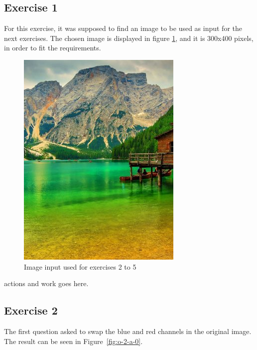 \documentclass[]{IEEEtran}
\begin{document}
  \subsection{Exercise 1}
  For this exercise, it was supposed to find an image to be used as input for the next exercises. The chosen image is displayed in figure \ref{fig:i-1-0}, and it is 300x400 pixels, in order to fit the requirements.
  \begin{figure}[!h]
    \centering
    \includegraphics[width=0.8\hsize]{../input/i-1-0.jpg}
    \caption{Image input used for exercises 2 to 5}
    \label{fig:i-1-0}
  \end{figure}

  actions and work goes here.
  
  
  
  \subsection{Exercise 2}
  
  The first question asked to swap the blue and red channels in the original image. The result can be seen in Figure~\ref{fig:o-2-a-0}.
  
\end{document}
